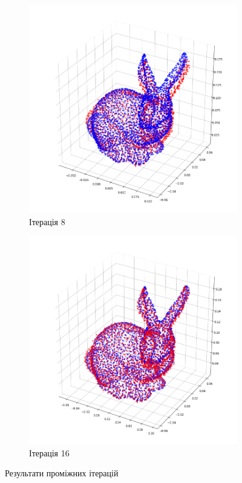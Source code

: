 \begin{figure}[h]
  \begin{subfigure}[b]{0.4\textwidth}
      \includegraphics[width=\textwidth]{images/bunny_8}
      \caption{Ітерація 8}
  \end{subfigure}
  \begin{subfigure}[b]{0.4\textwidth}
      \includegraphics[width=\textwidth]{images/bunny_16}
      \caption{Ітерація 16}
  \end{subfigure}
  \caption{Результати проміжних ітерацій}
  \label{fig:bunny:iterations}
\end{figure}

